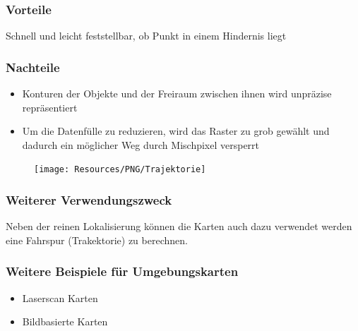 \subsubsection{Vorteile}
Schnell und leicht feststellbar, ob Punkt in einem Hindernis liegt

\subsubsection{Nachteile}
\begin{itemize}
	\item Konturen der Objekte und der Freiraum zwischen ihnen wird unpräzise repräsentiert
	\item Um die Datenfülle zu reduzieren, wird das Raster zu grob gewählt und dadurch ein möglicher Weg durch Mischpixel versperrt
\end{itemize}

{
\begin{figure}
	\vspace{-1cm}
	\texttt{[image: Resources/PNG/Trajektorie]}
\end{figure}

\subsubsection{Weiterer Verwendungszweck}
Neben der reinen Lokalisierung können die Karten auch dazu verwendet werden
eine Fahrspur (Trakektorie) zu berechnen.

}

\subsubsection{Weitere Beispiele für Umgebungskarten}
\begin{itemize}
	\item Laserscan Karten
	\item Bildbasierte Karten
\end{itemize}


